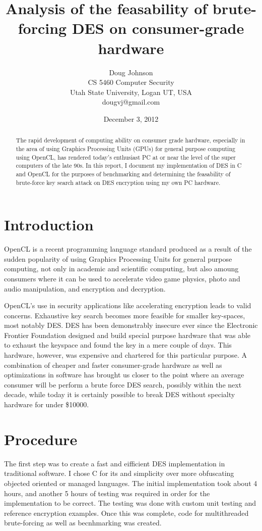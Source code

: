 \documentclass[12pt]{article}
\title{Analysis of the feasability of brute-forcing DES on consumer-grade hardware }
\author{Doug Johnson\\
CS 5460 Computer Security\\
Utah State University, Logan UT, USA\\
dougvj@gmail.com\\
}
\date{December 3, 2012}
\begin{document}
\maketitle

\begin{abstract}
The rapid development of computing ability on consumer grade hardware, especially in the area of using Graphics Processing Units (GPUs) for general purpose computing using OpenCL, has rendered today's enthusiast PC at or near the level of the super computers of the late 90s. In this report, I document my implementation of DES in C and OpenCL for the purposes of benchmarking and determining the feasability of brute-force key search attack on DES encryption using my own PC hardware. 
\end{abstract}

\section{Introduction}
OpenCL is a recent programming language standard produced as a result of the sudden popularity of using Graphics Processing Units for general purpose computing, not only in academic and scientific computing, but also amoung consumers where it can be used to accelerate video game physics, photo and audio manipulation, and encryption and decryption.

OpenCL's use in security applications like accelerating encryption leads to valid concerns. Exhaustive key search becomes more feasible for smaller key-spaces, most notably DES. DES has been demonstrably insecure ever since the Electronic Frontier Foundation designed and build special purpose hardware that was able to exhaust the keyspace and found the key in a mere couple of days. This hardware, however, was expensive and chartered for this particular purpose. A combination of cheaper and faster consumer-grade hardware as well as optimizations in software has brought us closer to the point where an average consumer will be perform a brute force DES search, possibly within the next decade, while today it is certainly possible to break DES without specialty hardware for under \$10000.  

\section{Procedure}
The first step was to create a fast and eifficient DES implementation in traditional software. I chose C for its and simplicity over more obfuscating objected oriented or managed languages. The initial implementation took about 4 hours, and another 5 hours of testing was required in order for the implementation to be correct. The testing was done with custom unit testing and reference encryption examples. Once this was complete, code for multithreaded brute-forcing as well as becnhmarking was created.
\end{document}
